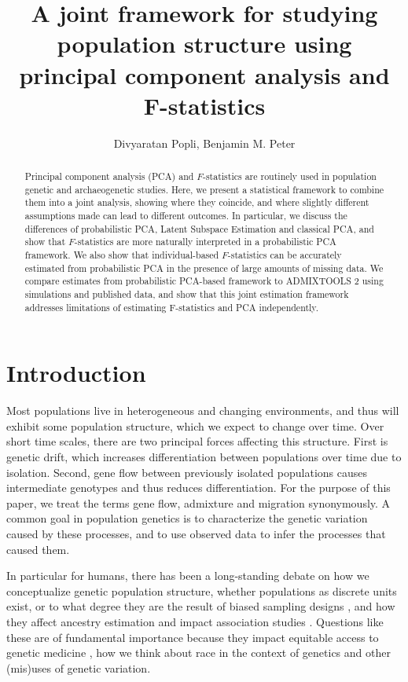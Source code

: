 \documentclass[12pt]{article}
\title{A joint framework for studying population structure using principal component analysis and F-statistics}
\author{Divyaratan Popli, Benjamin M. Peter}
\begin{document}
\maketitle


\begin{abstract}

\noindent Principal component analysis (PCA) and $F$-statistics are routinely used in population genetic and archaeogenetic studies.  Here, we present a statistical framework to combine them into a joint analysis, showing where they coincide, and where slightly different assumptions made can lead to different outcomes. In particular, we discuss the differences of probabilistic PCA, Latent Subspace Estimation and classical PCA, and show that $F$-statistics are more naturally interpreted in a probabilistic PCA framework. We also show that individual-based $F$-statistics can be accurately estimated from probabilistic PCA in the presence of large amounts of missing data. We compare estimates from probabilistic PCA-based framework to ADMIXTOOLS 2 using simulations and published data, and show that this joint estimation framework addresses limitations of estimating F-statistics and PCA independently.

\end{abstract}

\section{Introduction}

Most populations live in heterogeneous and changing environments, and thus will exhibit some population structure, which we expect to change over time. Over short time scales, there are two principal forces affecting this structure. First is genetic drift, which increases differentiation between populations over time due to isolation. Second, gene flow between previously isolated populations causes intermediate genotypes and thus reduces differentiation. For the purpose of this paper, we treat the terms gene flow, admixture and migration synonymously. A common goal in population genetics is to characterize the genetic variation caused by these processes, and to use observed data to infer the processes that caused them.

In particular for humans, there has been a long-standing debate on how we conceptualize genetic population structure, whether populations as discrete units exist, or to what degree they are the result of biased sampling designs \citep{serre_evidence_2004, rosenberg_clines_2005, peter_genetic_2020}, and how they affect ancestry estimation \citep{mathieson_what_2020, simon_contribution_2023} and impact association studies \citep{price_principal_2006}. Questions like these are of fundamental importance because they impact equitable access to genetic medicine \citep{popejoy_genomics_2016}, how we think about race in the context of genetics \citep{lewontin_apportionment_1972, novembre_background_2022} and other (mis)uses of genetic variation.
\end{document}
